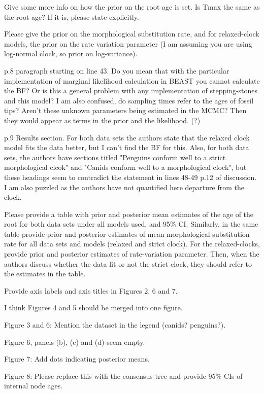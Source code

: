 \documentclass[11pt]{article}
\begin{document}
Give some more info on how the prior on the root age is set. Is Tmax the same as the root age? If it is, please state explicitly.

Please give the prior on the morphological substitution rate, and for relaxed-clock models, the prior on the rate variation parameter (I am assuming you are using log-normal clock, so prior on log-variance).

p.8 paragraph starting on line 43. Do you mean that with the particular implementation of marginal likelihood calculation in BEAST you cannot calculate the BF? Or is this a general problem with any implementation of stepping-stones and this model? I am also confused, do sampling times refer to the ages of fossil tips? Aren't these unknown parameters being estimated in the MCMC? Then they would appear as terms in the prior and the likelihood. (?)

p.9 Results section. For both data sets the authors state that the relaxed clock model fits the data better, but I can't find the BF for this. Also, for both data sets, the authors have sections titled "Penguins conform well to a strict morphological clcok" and "Canids conform well to a morphological clock", but these headings seem to contradict the statement in lines 48-49 p.12 of discussion. I am also puzzled as the authors have not quantified here departure from the clock. 

Please provide a table with prior and posterior mean estimates of the age of the root for both data sets under all models used, and 95\% CI. Similarly, in the same table provide prior and posterior estimates of mean morphological substitution rate for all data sets and models (relaxed and strict clock). For the relaxed-clocks, provide prior and posterior estimates of rate-variation parameter. Then, when the authors discuss whether the data fit or not the strict clock, they should refer to the estimates in the table.

Provide axis labels and axis titles in Figures 2, 6 and 7.

I think Figures 4 and 5 should be merged into one figure.

Figure 3 and 6: Mention the dataset in the legend (canids? penguins?).

Figure 6, panels (b), (c) and (d) seem empty.

Figure 7: Add dots indicating posterior means.

Figure 8: Please replace this with the consensus tree and provide 95\% CIs of internal node ages.
\end{document}

